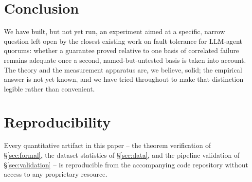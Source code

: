 \documentclass[journal]{IEEEtran}
\begin{document}
\section{Conclusion}

We have built, but not yet run, an experiment aimed at a specific, narrow question left open by the closest existing work on fault tolerance for LLM-agent quorums: whether a guarantee proved relative to one basis of correlated failure remains adequate once a second, named-but-untested basis is taken into account. The theory and the measurement apparatus are, we believe, solid; the empirical answer is not yet known, and we have tried throughout to make that distinction legible rather than convenient.

\appendices

\section{Reproducibility}
\label{app:repro}

Every quantitative artifact in this paper -- the theorem verification of \S\ref{sec:formal}, the dataset statistics of \S\ref{sec:data}, and the pipeline validation of \S\ref{sec:validation} -- is reproducible from the accompanying code repository without access to any proprietary resource.
\end{document}
